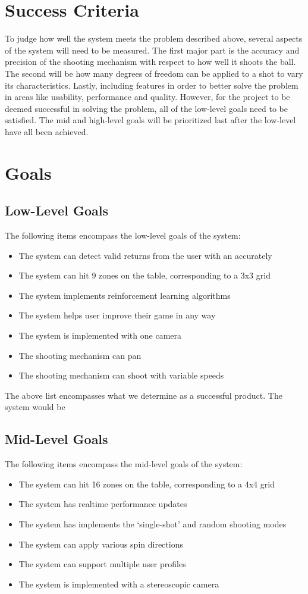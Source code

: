 \documentclass[11pt]{article}
\begin{document}
\section{Success Criteria}
To judge how well the system meets the problem described above, several aspects of the system will need to be measured. The first major part is the accuracy and precision of the shooting mechanism with respect to how well it shoots the ball. The second will be how many degrees of freedom can be applied to a shot to vary its characteristics. Lastly, including features in order to better solve the problem in areas like usability, performance and quality. However, for the project to be deemed successful in solving the problem, all of the low-level goals need to be satisfied. The mid and high-level goals will be prioritized last after the low-level have all been achieved.
\section{Goals}
\subsection{Low-Level Goals}
The following items encompass the low-level goals of the system:
\begin{itemize}
\item The system can detect valid returns from the user with an accurately
\item The system can hit 9 zones on the table, corresponding to a 3x3 grid
\item The system implements reinforcement learning algorithms
\item The system helps user improve their game in any way %
\item The system is implemented with one camera
\item The shooting mechanism can pan
\item The shooting mechanism can shoot with variable speeds
\end{itemize}
The above list encompasses what we determine as a successful product. The system would be 
\subsection{Mid-Level Goals}
The following items encompass the mid-level goals of the system:
\begin{itemize}
\item The system can hit 16 zones on the table, corresponding to a 4x4 grid
\item The system has realtime performance updates
\item The system has implements the `single-shot' and random shooting modes
\item The system can apply various spin directions
\item The system can support multiple user profiles
\item The system is implemented with a stereoscopic camera
\end{itemize}
\end{document}
